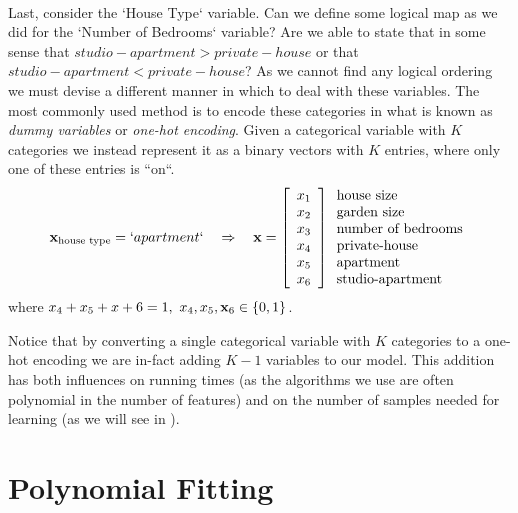 ~\\Last, consider the `House Type` variable. Can we define some logical map as we did for the `Number of Bedrooms` variable? Are we able to state that in some sense that $studio-apartment > private-house$ or that $studio-apartment < private-house$? As we cannot find any logical ordering we must devise a different manner in which to deal with these variables. The most commonly used method is to encode these categories in what is known as \textit{dummy variables} or \textit{one-hot encoding}. Given a categorical variable with $K$ categories we instead represent it as a binary vectors with $K$ entries, where only one of these entries is ``on``. $$ \mathbf{x}_{\text{house type}} = `apartment` \quad \Rightarrow \quad \mathbf{x} =
\left[\begin{array}{c} x_1\\ x_2\\ x_3 \\ x_4 \\ x_5 \\ x_6 \end{array}\right] \begin{array}{l}\text{house size}\\ \text{garden size}\\ \text{number of bedrooms}\\ \text{private-house}\\\text{apartment} \\ \text{studio-apartment} \end{array}
$$
where $x_4+x_5+x+6 = 1, \,\,x_4,x_5,\mathbf{x}_6\in\left\{0,1\right\}$. 

\begin{remark}
Notice that by converting a single categorical variable with $K$ categories to a one-hot encoding we are in-fact adding $K-1$ variables to our model. This addition has both influences on running times (as the algorithms we use are often polynomial in the number of features) and on the number of samples needed for learning (as we will see in ).
\end{remark}
\begin{remark}
\end{remark}

\section{Polynomial Fitting}

